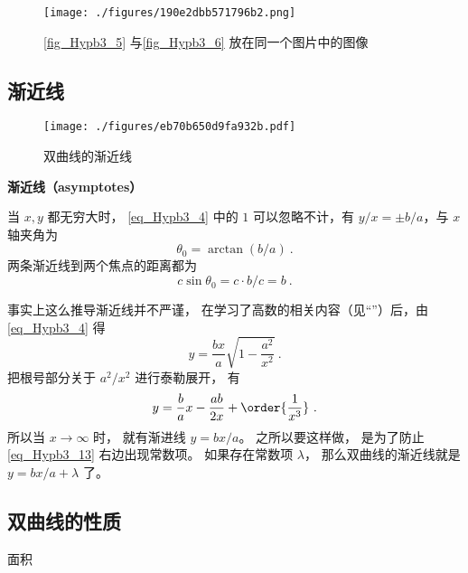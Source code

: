 \begin{figure}[ht]
\centering
\texttt{[image: ./figures/190e2dbb571796b2.png]}
\caption{\autoref{fig_Hypb3_5} 与\autoref{fig_Hypb3_6} 放在同一个图片中的图像} \label{fig_Hypb3_7}
\end{figure}
\subsection{渐近线}
\begin{figure}[ht]
\centering
\texttt{[image: ./figures/eb70b650d9fa932b.pdf]}
\caption{双曲线的渐近线} \label{fig_Hypb3_1}
\end{figure}
\textbf{渐近线（asymptotes）}

当 $x,y$ 都无穷大时， \autoref{eq_Hypb3_4} 中的 $1$ 可以忽略不计，有 $y/x = \pm b/a$，与 $x$ 轴夹角为
\begin{equation}\label{eq_Hypb3_1}
\theta_0 = \arctan(b/a)~.
\end{equation}
两条渐近线到两个焦点的距离都为
\begin{equation}\label{eq_Hypb3_11}
c\sin\theta_0 = c\cdot b/c = b~.
\end{equation}

事实上这么推导渐近线并不严谨， 在学习了高数的相关内容（见“”）后，由\autoref{eq_Hypb3_4} 得
\begin{equation}
y = \frac{bx}{a} \sqrt{1-\frac{a^2}{x^2}}~.
\end{equation}
把根号部分关于 $a^2/x^2$ 进行泰勒展开， 有
\begin{equation}\label{eq_Hypb3_13}
y = \frac ba x - \frac{ab}{2x} + \order{\frac{1}{x^3}}~.
\end{equation}
所以当 $x\to\infty$ 时， 就有渐进线 $y = bx/a$。 之所以要这样做， 是为了防止\autoref{eq_Hypb3_13} 右边出现常数项。 如果存在常数项 $\lambda$， 那么双曲线的渐近线就是 $y = bx/a + \lambda$ 了。

\subsection{双曲线的性质}
面积









